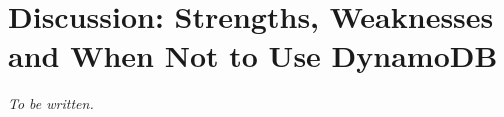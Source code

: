 
\section{Discussion: Strengths, Weaknesses and When Not to Use DynamoDB}\label{sec:discussion}

\textit{To be written.}
